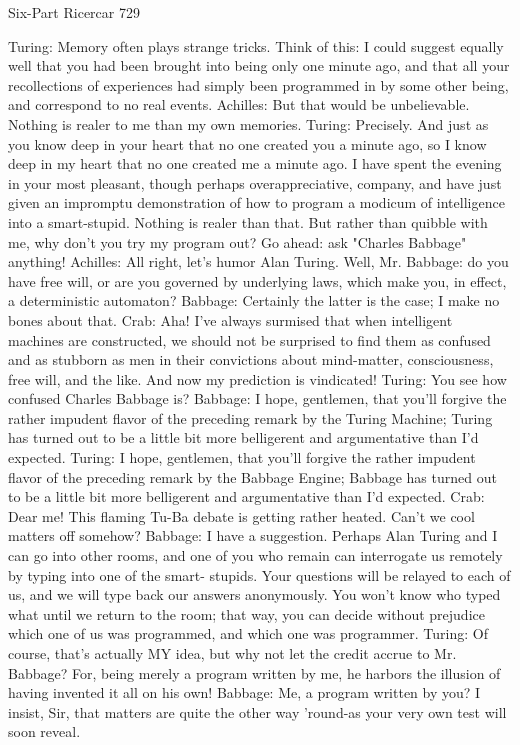 Six-Part Ricercar                                                                      729

Turing: Memory often plays strange tricks. Think of this: I could suggest equally well
  that you had been brought into being only one minute ago, and that all your
  recollections of experiences had simply been programmed in by some other being, and
  correspond to no real events.
Achilles: But that would be unbelievable. Nothing is realer to me than my own memories.
Turing: Precisely. And just as you know deep in your heart that no one created you a
  minute ago, so I know deep in my heart that no one created me a minute ago. I have
  spent the evening in your most pleasant, though perhaps overappreciative, company,
  and have just given an impromptu demonstration of how to program a modicum of
  intelligence into a smart-stupid. Nothing is realer than that. But rather than quibble
  with me, why don't you try my program out? Go ahead: ask "Charles Babbage"
  anything!
Achilles: All right, let's humor Alan Turing. Well, Mr. Babbage: do you have free will, or
  are you governed by underlying laws, which make you, in effect, a deterministic
  automaton?
Babbage: Certainly the latter is the case; I make no bones about that.
Crab: Aha! I've always surmised that when intelligent machines are constructed, we
  should not be surprised to find them as confused and as stubborn as men in their
  convictions about mind-matter, consciousness, free will, and the like. And now my
  prediction is vindicated!
Turing: You see how confused Charles Babbage is?
Babbage: I hope, gentlemen, that you'll forgive the rather impudent flavor of the
  preceding remark by the Turing Machine; Turing has turned out to be a little bit more
  belligerent and argumentative than I'd expected.
Turing: I hope, gentlemen, that you'll forgive the rather impudent flavor of the preceding
  remark by the Babbage Engine; Babbage has turned out to be a little bit more
  belligerent and argumentative than I'd expected.
Crab: Dear me! This flaming Tu-Ba debate is getting rather heated. Can't we cool matters
  off somehow?
Babbage: I have a suggestion. Perhaps Alan Turing and I can go into other rooms, and
  one of you who remain can interrogate us remotely by typing into one of the smart-
  stupids. Your questions will be relayed to each of us, and we will type back our
  answers anonymously. You won't know who typed what until we return to the room;
  that way, you can decide without prejudice which one of us was programmed, and
  which one was programmer.
Turing: Of course, that's actually MY idea, but why not let the credit accrue to Mr.
  Babbage? For, being merely a program written by me, he harbors the illusion of
  having invented it all on his own!
Babbage: Me, a program written by you? I insist, Sir, that matters are quite the other way
  'round-as your very own test will soon reveal.




